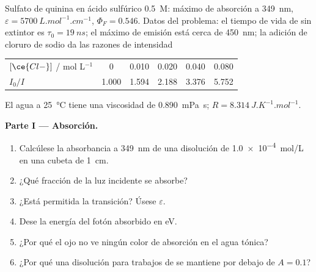 \begin{problem}
\label{pb:b3:electronic-spectroscopy:1}
Sulfato de quinina en ácido sulfúrico \qty{0.5}{M}: máximo de absorción a \qty{349}{nm},
$\varepsilon = \qty{5700}{L.mol^{-1}.cm^{-1}}$, $\Phi_F = 0.546$. Datos del problema: el
tiempo de vida de  sin extintor es $\tau_0 = \qty{19}{ns}$; el máximo de emisión
está cerca de \qty{450}{nm}; la adición de cloruro de sodio da las razones de intensidad
\begin{center}\small
\begin{tabular}{lccccc}
\hline
$[\ce{Cl-}]$ / mol L$^{-1}$ & 0 & 0.010 & 0.020 & 0.040 & 0.080 \\
$I_0/I$ & 1.000 & 1.594 & 2.188 & 3.376 & 5.752 \\ \hline
\end{tabular}
\end{center}
El agua a \qty{25}{\celsius} tiene una viscosidad de \qty{0.890}{mPa.s}; $R =
\qty{8.314}{J.K^{-1}.mol^{-1}}$.

\medskip\noindent\textbf{Parte I --- Absorción.}
\begin{enumerate}
  \item Calcúlese la absorbancia a \qty{349}{nm} de una disolución de \qty{1.0e-4}{mol/L} en una
        cubeta de \qty{1}{cm}.
  \item ¿Qué fracción de la luz incidente se absorbe?
  \item ¿Está permitida la transición? Úsese $\varepsilon$.
  \item Dese la energía del fotón absorbido en eV.
  \item ¿Por qué el ojo no ve ningún color de absorción en el agua tónica?
  \item ¿Por qué una disolución para trabajos de  se mantiene por debajo de $A = 0.1$?
\end{enumerate}


\end{problem}
